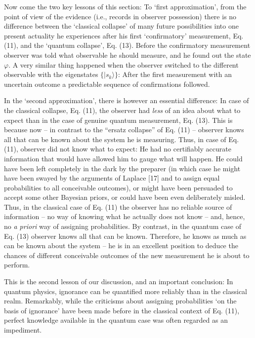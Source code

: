 \documentclass[aps,twocolumn,pra,epsfig]{revtex4}
\begin{document}
Now come the two key lessons of this section: To `first approximation', from
the point of view of the evidence (i.e., records in observer possession) 
there is no difference between the `classical collapse' of many future 
possibilities into one present actuality he experiences after his first 
`confirmatory' measurement, Eq. (11), and the `quantum collapse', Eq. (13). 
Before the confirmatory measurement observer was told what observable 
he should measure, and he found out the state $\varphi$. A very similar
thing happened when the observer switched to the different observable with
the eigenstates $\{|s_k\rangle\}$: After the first measurement with
an uncertain outcome a predictable sequence of confirmations followed.

In the `second approximation', there is however an essential difference: In
case of the classical collapse, Eq. (11), the observer had {\it less} of an idea
about what to expect than in the case of genuine quantum measurement, Eq. (13).
This is because now -- in contrast to the ``ersatz collapse'' of Eq. (11) --
observer knows all that can be known about the system he is measuring. Thus,
in case of Eq. (11), observer did not know what to expect: He had no certifiably
accurate information that would have allowed him to gauge what will happen. He
could have been left completely in the dark by the preparer (in which case he
might have been swayed by the arguments of Laplace [17] and to assign equal
probabilities to all conceivable outcomes), or might have been persuaded to
accept some other Bayesian priors, or could have been even deliberately misled.
Thus, in the classical case of Eq. (11) the observer has no reliable source of
information -- no way of knowing what he actually does not know -- and, hence,
no {\it a priori} way of assigning probabilities. By contrast, in the quantum
case of Eq. (13) observer knows all that can be known. Therefore, he knows as
much as can be known about the system -- he is in an excellent position to
deduce the chances of different conceivable outcomes of the new measurement
he is about to perform.

This is the second lesson of our discussion, and an important conclusion:
In quantum physics, ignorance can be quantified more reliably than
in the classical realm. Remarkably, while the criticisms about assigning
probabilities `on the basis of ignorance' have been made before
in the classical context of Eq. (11), perfect knowledge available in the
quantum case was often regarded as an impediment.
\end{document}
